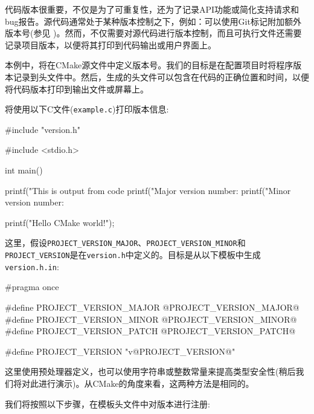 代码版本很重要，不仅是为了可重复性，还为了记录API功能或简化支持请求和bug报告。源代码通常处于某种版本控制之下，例如：可以使用Git标记附加额外版本号(参见 )。然而，不仅需要对源代码进行版本控制，而且可执行文件还需要记录项目版本，以便将其打印到代码输出或用户界面上。

本例中，将在CMake源文件中定义版本号。我们的目标是在配置项目时将程序版本记录到头文件中。然后，生成的头文件可以包含在代码的正确位置和时间，以便将代码版本打印到输出文件或屏幕上。


将使用以下C文件(\texttt{example.c})打印版本信息:

\begin{codebox}[cpp]
#include "version.h"

#include <stdio.h>

int main() {
  printf("This is output from code %
  printf("Major version number: %
  printf("Minor version number: %
  
  printf("Hello CMake world!\n");
}
\end{codebox}

这里，假设\texttt{PROJECT\_VERSION\_MAJOR}、\texttt{PROJECT\_VERSION\_MINOR}和\texttt{PROJECT\_VERSION}是在\texttt{version.h}中定义的。目标是从以下模板中生成\texttt{version.h.in}:

\begin{codebox}[cpp]
#pragma once

#define PROJECT_VERSION_MAJOR @PROJECT_VERSION_MAJOR@
#define PROJECT_VERSION_MINOR @PROJECT_VERSION_MINOR@
#define PROJECT_VERSION_PATCH @PROJECT_VERSION_PATCH@

#define PROJECT_VERSION "v@PROJECT_VERSION@"
\end{codebox}

这里使用预处理器定义，也可以使用字符串或整数常量来提高类型安全性(稍后我们将对此进行演示)。从CMake的角度来看，这两种方法是相同的。


我们将按照以下步骤，在模板头文件中对版本进行注册:

